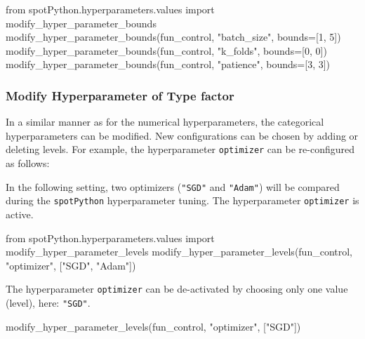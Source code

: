 \documentclass[
  letterpaper,
  DIV=11,
  numbers=noendperiod]{scrreprt}
\newenvironment{Shaded}{\begin{snugshade}}{\end{snugshade}}
\newcommand{\DecValTok}[1]{\textcolor[rgb]{0.68,0.00,0.00}{#1}}
\newcommand{\ImportTok}[1]{\textcolor[rgb]{0.00,0.46,0.62}{#1}}
\newcommand{\NormalTok}[1]{\textcolor[rgb]{0.00,0.23,0.31}{#1}}
\newcommand{\OperatorTok}[1]{\textcolor[rgb]{0.37,0.37,0.37}{#1}}
\newcommand{\StringTok}[1]{\textcolor[rgb]{0.13,0.47,0.30}{#1}}
\begin{document}
\begin{Shaded}
\begin{Highlighting}[]
\ImportTok{from}\NormalTok{ spotPython.hyperparameters.values }\ImportTok{import}\NormalTok{ modify\_hyper\_parameter\_bounds}
\NormalTok{modify\_hyper\_parameter\_bounds(fun\_control, }
    \StringTok{"batch\_size"}\NormalTok{, bounds}\OperatorTok{=}\NormalTok{[}\DecValTok{1}\NormalTok{, }\DecValTok{5}\NormalTok{])}
\NormalTok{modify\_hyper\_parameter\_bounds(fun\_control, }
    \StringTok{"k\_folds"}\NormalTok{, bounds}\OperatorTok{=}\NormalTok{[}\DecValTok{0}\NormalTok{, }\DecValTok{0}\NormalTok{])}
\NormalTok{modify\_hyper\_parameter\_bounds(fun\_control, }
    \StringTok{"patience"}\NormalTok{, bounds}\OperatorTok{=}\NormalTok{[}\DecValTok{3}\NormalTok{, }\DecValTok{3}\NormalTok{])}
\end{Highlighting}
\end{Shaded}

\hypertarget{modify-hyperparameter-of-type-factor-1}{%
\subsubsection{Modify Hyperparameter of Type
factor}\label{modify-hyperparameter-of-type-factor-1}}

In a similar manner as for the numerical hyperparameters, the
categorical hyperparameters can be modified. New configurations can be
chosen by adding or deleting levels. For example, the hyperparameter
\texttt{optimizer} can be re-configured as follows:

In the following setting, two optimizers (\texttt{"SGD"} and
\texttt{"Adam"}) will be compared during the \texttt{spotPython}
hyperparameter tuning. The hyperparameter \texttt{optimizer} is active.

\begin{Shaded}
\begin{Highlighting}[]
\ImportTok{from}\NormalTok{ spotPython.hyperparameters.values }\ImportTok{import}\NormalTok{ modify\_hyper\_parameter\_levels}
\NormalTok{modify\_hyper\_parameter\_levels(fun\_control,}
     \StringTok{"optimizer"}\NormalTok{, [}\StringTok{"SGD"}\NormalTok{, }\StringTok{"Adam"}\NormalTok{])}
\end{Highlighting}
\end{Shaded}

The hyperparameter \texttt{optimizer} can be de-activated by choosing
only one value (level), here: \texttt{"SGD"}.

\begin{Shaded}
\begin{Highlighting}[]
\NormalTok{modify\_hyper\_parameter\_levels(fun\_control, }\StringTok{"optimizer"}\NormalTok{, [}\StringTok{"SGD"}\NormalTok{])}
\end{Highlighting}
\end{Shaded}
\end{document}
